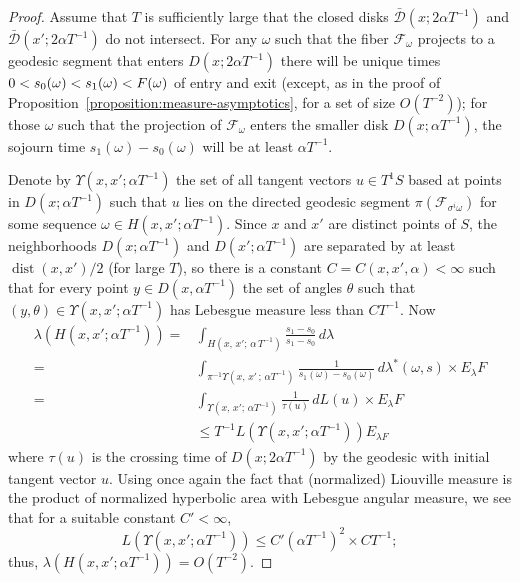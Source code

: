 \documentclass[10pt]{amsart}
\theoremstyle{definition}\newtheorem{defi}[theo]{Definition}\newtheorem{rema}[theo]{Remark}\newtheorem{exam}[theo]{Example}\newtheorem{exem}[theo]{Example}\newtheorem{nota}[theo]{Notation}
\DeclareMathOperator{\dist}{dist}
\begin{document}
\begin{proof}
Assume that $T$ is sufficiently large that the closed disks $\bar{\mathcal{D}} (x;2\alpha T^{-1})$ and $\bar{\mathcal{D}} (x';2\alpha T^{-1})$ do not intersect. For any $\omega$ such that the fiber $\mathcal{F}_{\omega}$ projects to a geodesic segment that enters $D(x;2\alpha T^{-1})$ there will be unique times $0<s_{0} (\omega)\linebreak<s_{1} (\omega)<F (\omega)$ of entry and exit (except, as in the proof of Proposition~\ref{proposition:measure-asymptotics}, for a set of size $O(T^{-2})$); for those $\omega$ such that the projection of $\mathcal{F}_{\omega }$ enters the smaller disk $D(x;\alpha T^{-1})$, the sojourn time $s_{1} (\omega)-s_{0} (\omega)$ will be at least $\alpha T^{-1}$.

Denote by $\Upsilon (x,x';\alpha T^{-1})$ the set of all tangent vectors $u\in T^1S$ based at points in $D(x;\alpha T^{-1})$ such that $u$ lies on the directed geodesic segment $\pi (\mathcal{F}_{\sigma^{i}\omega})$ for some sequence $\omega \in H (x,x';\alpha T^{-1})$. Since $x$ and $x'$ are distinct points of $S$, the neighborhoods $D(x;\alpha T^{-1})$ and $D(x';\alpha T^{-1})$ are separated by at least $\dist (x,x')/2$ (for large $T$), so there is a constant $C=C (x,x',\alpha) <\infty$ such that for every point $y\in D(x,\alpha T^{-1})$ the set of angles $\theta$ such that $(y,\theta)\in \Upsilon (x,x';\alpha T^{-1})$ has Lebesgue measure less than $CT^{-1}$. Now
\begin{align*}
\lambda (H (x,x';\alpha T^{-1}))=&\int_{H (x,\,x';\,\alpha\, T^{-1})}
\frac{s_{1}-s_{0}}{s_{1}-s_{0}} \,d\lambda \\
=& \int_{\pi^{-1}\Upsilon (x,\,x'\,;\,\alpha T^{-1})} \frac{1}{s_{1} (\omega)-s_{0} (\omega)} \,d\lambda^{*} (\omega,s)\times E_{\lambda}F\\
=&\int_{\Upsilon (x,\,x';\,\alpha T^{-1})} \frac{1}{\tau (u)}
\,dL(u) \times E_{\lambda}F \\
&\leq T^{-1} L \left(\Upsilon \left(x,x';\alpha T^{-1}\right)\right)E_{\lambda F}
\end{align*}
where $\tau (u)$ is the crossing time of $D(x;2\alpha T^{-1})$ by the geodesic with initial tangent vector $u$. Using once again the fact that (normalized) Liouville measure is the product of normalized hyperbolic area with Lebesgue angular measure, we see that for a suitable constant $C'<\infty$,
\[
L \left(\Upsilon\left(x,x';\alpha T^{-1}\right)\right)\leq C' (\alpha T^{-1})^{2} \times CT^{-1};
\]
thus, $\lambda (H (x,x';\alpha T^{-1}))=O (T^{-2})$.
\end{proof}
\end{document}
